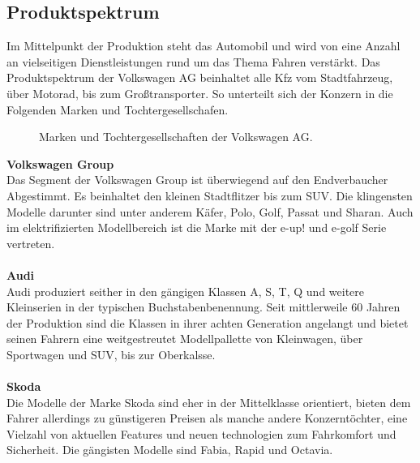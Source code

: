 \documentclass[12pt]{article}
\begin{document}
\subsection{Produktspektrum}
Im Mittelpunkt der Produktion steht das Automobil und wird von eine Anzahl an vielseitigen Dienstleistungen rund um das Thema Fahren verstärkt.
Das Produktspektrum der Volkswagen AG beinhaltet alle Kfz vom Stadtfahrzeug, über Motorad, bis zum Großtransporter.
So unterteilt sich der Konzern in die Folgenden Marken und Tochtergesellschafen.
\begin{figure}[here!]
\centering
\caption{Marken und Tochtergesellschaften der Volkswagen AG. \cite{marken}}
\end{figure}\FloatBarrier
\noindent
\textbf{Volkswagen Group}\\
Das Segment der Volkswagen Group ist überwiegend auf den Endverbaucher Abgestimmt. Es beinhaltet den kleinen Stadtflitzer bis zum SUV. Die klingensten Modelle darunter sind unter anderem Käfer, Polo, Golf, Passat und Sharan.
Auch im elektrifizierten Modellbereich ist die Marke mit der e-up! und e-golf Serie vertreten.\\
\\
\textbf{Audi}\\
Audi produziert seither in den gängigen Klassen A, S, T, Q und weitere Kleinserien in der typischen Buchstabenbenennung. Seit mittlerweile 60 Jahren der Produktion sind die Klassen in ihrer achten Generation angelangt und bietet seinen Fahrern eine weitgestreutet Modellpallette von Kleinwagen, über Sportwagen und SUV, bis zur Oberkalsse.\\
\\
\textbf{Skoda}\\
Die Modelle der Marke Skoda sind eher in der Mittelklasse orientiert, bieten dem Fahrer allerdings zu günstigeren Preisen als manche andere Konzerntöchter, eine Vielzahl von aktuellen Features und neuen technologien zum Fahrkomfort und Sicherheit.
Die gängisten Modelle sind Fabia, Rapid und Octavia.
\end{document}
